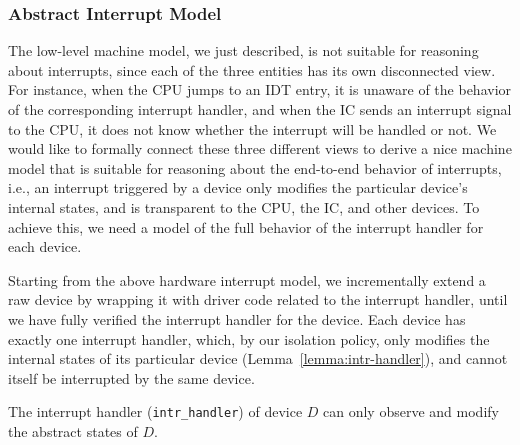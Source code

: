 
\subsubsection{Abstract Interrupt Model} \label{sec:interrupt}

The low-level machine model, we just described, is not suitable for
reasoning about interrupts, since each of the three entities has its
own disconnected view.  For instance, when the CPU jumps to an IDT
entry, it is unaware of the behavior of the corresponding interrupt
handler, and when the IC sends an interrupt signal to the CPU, it does
not know whether the interrupt will be handled or not. We would like
to formally connect these three different views to derive a nice
machine model that is suitable for reasoning about the end-to-end
behavior of interrupts, i.e., an interrupt triggered by a device only
modifies the particular device's internal states, and is transparent
to the CPU, the IC, and other devices.  To achieve this, we need a
model of the full behavior of the interrupt handler for each device.

Starting from the above hardware interrupt model, we incrementally extend a raw
device by wrapping it with driver code related to the interrupt handler, until
we have fully verified the interrupt handler for the device.  Each device has
exactly one interrupt handler, which, by our isolation policy, only modifies
the internal states of its particular device (Lemma~\ref{lemma:intr-handler}),
and cannot itself be interrupted by the same device.

\begin{lemma} \label{lemma:intr-handler}
The interrupt handler (\texttt{intr\_handler}) of device $D$ can only observe
and modify the abstract states of $D$.
\end{lemma}

